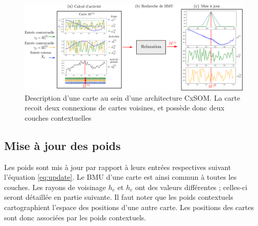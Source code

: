 \begin{figure}
\centering
\includegraphics[width=\textwidth]{map_2layers.pdf}
\caption{Description d'une carte au sein d'une architecture CxSOM. La carte recoit deux connexions de cartes voisines, et possède donc deux couches contextuelles}
\label{fig:one_map}
\end{figure}

\subsection{Mise à jour des poids}

Les poids sont mis à jour par rapport à leurs entrées respectives suivant l'équation \ref{eq:update}. Le BMU d'une carte est ainsi commun à toutes les couches. Les rayons de voisinage $h_e$ et $h_c$ ont des valeurs différentes ; celles-ci seront détaillée en partie suivante. 
Il faut noter que les poids contextuels cartographient l'espace des positions d'une autre carte. Les positions des cartes sont donc associées par les poids contextuels.

